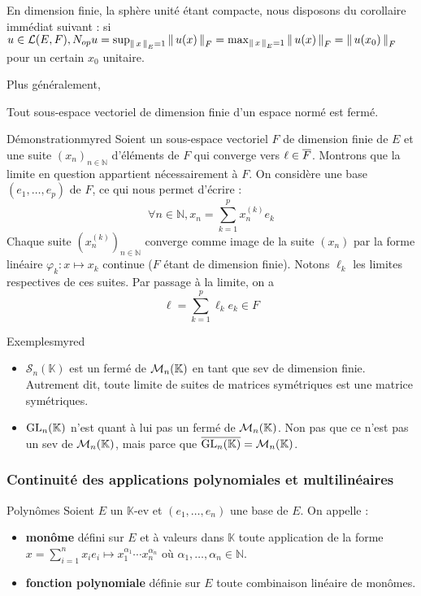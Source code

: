     En dimension finie, la sphère unité étant compacte, nous disposons du corollaire immédiat suivant : si $u \in \mathcal{L}(E,F), N_{op}{u} = \sup_{\left\lVert \,x \, \right\rVert_E = 1} \left\lVert \,u(x) \, \right\rVert_F = \max_{\left\lVert \,x \, \right\rVert_E = 1} \left\lVert \,u(x) \, \right\rVert_F = \left\lVert \,u(x_0) \, \right\rVert_F$ pour un certain $x_0$ unitaire.

    Plus généralement, 

    \begin{theo}{}{}
        Tout sous-espace vectoriel de dimension finie d’un espace normé est fermé.
    \end{theo}

    \begin{demo}{Démonstration}{myred}
        Soient un sous-espace vectoriel $F$ de dimension finie de $E$ et une suite $(x_n)_{n \in \mathbb{N}}$ d’éléments de $F$ qui converge vers $\ell \in \overline{F}$. Montrons que la limite en question appartient nécessairement à $F$. On considère une base $(e_1,\ldots,e_p)$ de $F$, ce qui nous permet d’écrire :
        \[ \forall n \in \mathbb{N}, x_n = \sum_{k=1}^p x_n^{(k)} e_k \] 
        Chaque suite $(x_n^{(k)})_{n \in \mathbb{N}}$ converge comme image de la suite $(x_n)$ par la forme linéaire $\varphi_k : x \mapsto x_k$ continue ($F$ étant de dimension finie). Notons $\ell_k$ les limites respectives de ces suites. Par passage à la limite, on a 
        \[ \ell = \sum_{k=1}^p \ell_k e_k \in F \] 
    \end{demo}

    \begin{omed}{Exemples}{myred}
        \begin{itemize}
            \item $\mathcal{S}_n(\mathbb{K})$ est un fermé de $\mathcal{M}_{n}(\mathbb{K})$ en tant que sev de dimension finie. Autrement dit, toute limite de suites de matrices symétriques est une matrice symétriques.
            \item $\operatorname{GL}_n(\mathbb{K})$ n’est quant à lui pas un fermé de $\mathcal{M}_{n}(\mathbb{K})$. Non pas que ce n’est pas un sev de $\mathcal{M}_{n}(\mathbb{K})$, mais parce que $\overline{\operatorname{GL}_n(\mathbb{K})} = \mathcal{M}_{n}(\mathbb{K})$.
        \end{itemize}
    \end{omed}

    \subsubsection{Continuité des applications polynomiales et multilinéaires}

    \begin{defi}{Polynômes}{}
        Soient $E$ un $\mathbb{K}$-ev et $(e_1,\ldots,e_n)$ une base de $E$. On appelle :
        \begin{itemize}
            \item \textbf{monôme} défini sur $E$ et à valeurs dans $\mathbb{K}$ toute application de la forme $x = \sum_{i=1}^n x_i e_i \longmapsto x_1^{\alpha_1} \cdots x_n^{\alpha_n}$ où $\alpha_1,\ldots,\alpha_n \in \mathbb{N}$.
            \item \textbf{fonction polynomiale} définie sur $E$ toute combinaison linéaire de monômes.
        \end{itemize}
    \end{defi}

